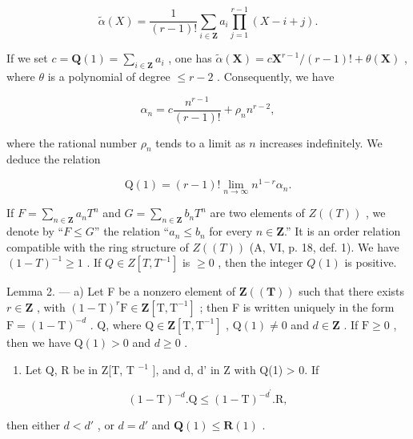 \[
\tilde {\alpha} (X) = \frac {1}{(r - 1) !} \sum_ {i \in \mathbf {Z}} a _ {i} \prod_ {j = 1} ^ {r - 1} (X - i + j).
\]

If we set \(c = \mathbf{Q}(1) = \sum_{i \in \mathbf{Z}} a_i\) , one has \(\tilde{\alpha}(\mathbf{X}) = c\mathbf{X}^{r-1}/(r - 1)! + \theta(\mathbf{X})\) , where \(\theta\) is a polynomial of degree \(\leqslant r - 2\) . Consequently, we have

\[
\alpha_ {n} = c \frac {n ^ {r - 1}}{(r - 1) !} + \rho_ {n} n ^ {r - 2},\tag{2}
\]

where the rational number \(\rho_{n}\) tends to a limit as \(n\) increases indefinitely. We deduce the relation

\[
\mathrm{Q} (1) = (r - 1)! \lim _ {n \rightarrow \infty} n ^ {1 - r} \alpha_ {n}.\tag{3}
\]

If \(F = \sum_{n \in \mathbf{Z}} a_n T^n\) and \(G = \sum_{n \in \mathbf{Z}} b_n T^n\) are two elements of \(Z((T))\) , we denote by “\(F \leqslant G\)” the relation “\(a_n \leqslant b_n\) for every \(n \in \mathbf{Z}\).” It is an order relation compatible with the ring structure of \(Z((T))\) (A, VI, p. 18, def. 1). We have \((1 - T)^{-1} \geqslant 1\) . If \(Q \in Z[T, T^{-1}]\) is \(\geqslant 0\) , then the integer \(Q(1)\) is positive.

Lemma 2. --- a) Let F be a nonzero element of \(\mathbf{Z}((\mathbf{T}))\) such that there exists \(r \in \mathbf{Z}\) , with \((1 - \mathrm{T})^r\mathrm{F} \in \mathbf{Z}[\mathrm{T}, \mathrm{T}^{-1}]\) ; then F is written uniquely in the form \(\mathrm{F} = (1 - \mathrm{T})^{-d}\) . Q, where \(\mathrm{Q} \in \mathbf{Z}[\mathrm{T}, \mathrm{T}^{-1}]\) , \(\mathrm{Q}(1) \neq 0\) and \(d \in \mathbf{Z}\) . If \(\mathrm{F} \geqslant 0\) , then we have \(\mathrm{Q}(1) > 0\) and \(d \geqslant 0\) .

\begin{enumerate}
\def\labelenumi{\alph{enumi})}
\setcounter{enumi}{1}
\tightlist
\item
  Let Q, R be in Z{[}T, T \(^{-1}\) {]}, and d, d' in Z with Q(1) \textgreater{} 0. If
\end{enumerate}

\[
(1 - \mathrm{T}) ^ {- d}. \mathrm{Q} \leqslant (1 - \mathrm{T}) ^ {- d ^ {\prime}}. \mathrm{R},
\]

then either \(d < d'\) , or \(d = d'\) and \(\mathbf{Q}(1) \leqslant \mathbf{R}(1)\) .

